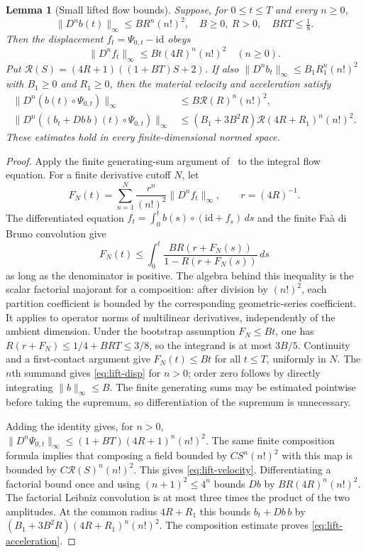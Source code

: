 \documentclass[11pt]{article}
\newtheorem{lemma}[theorem]{Lemma}
\theoremstyle{definition}
\begin{document}
\begin{lemma}[Small lifted flow bounds]\label{lem:small-lift}
Suppose, for $0\leq t\leq T$ and every $n\geq0$,
\[
 \|D^n b(t)\|_\infty\leq B R^n(n!)^2,
 \quad B\geq0,\ R>0,\quad BRT\leq\tfrac18.
\]
Then the displacement $f_t=\Psi_{0,t}-\mathrm{id}$ obeys
\begin{equation}\label{eq:lift-disp}
 \|D^n f_t\|_\infty\leq Bt(4R)^n(n!)^2 \quad(n\geq0).
\end{equation}
Put $\mathscr R(S)=(4R+1)((1+BT)S+2)$.
If also $\|D^n b_t\|_\infty\leq B_1R_1^n(n!)^2$ with
$B_1\ge0$ and $R_1\ge0$, then the
material velocity and acceleration satisfy
\begin{align}
 \|D^n(b(t)\circ\Psi_{0,t})\|_\infty
   &\leq B\mathscr R(R)^n(n!)^2,\label{eq:lift-velocity}\\
 \|D^n((b_t+Db\,b)(t)\circ\Psi_{0,t})\|_\infty
   &\leq(B_1+3B^2R)\mathscr R(4R+R_1)^n(n!)^2.
   \label{eq:lift-acceleration}
\end{align}
These estimates hold in every finite-dimensional normed space.
\end{lemma}
\begin{proof}
Apply the finite generating-sum argument of~\cite[\S3.8]{OAI} to
the integral flow equation. For a finite derivative cutoff $N$, let
\[
 F_N(t)=\sum_{n=1}^N\frac{r^n}{(n!)^2}
                 \|D^n f_t\|_\infty,\qquad r=(4R)^{-1}.
\]
The differentiated equation $f_t=\int_0^t b(s)\circ
(\mathrm{id}+f_s)\,ds$ and the finite Fa\`a di Bruno convolution give
\[
 F_N(t)\leq\int_0^t
  \frac{BR(r+F_N(s))}{1-R(r+F_N(s))}\,ds
\]
as long as the denominator is positive. The algebra behind this
inequality is the scalar factorial majorant for a composition: after
division by $(n!)^2$, each partition coefficient is bounded by the
corresponding geometric-series coefficient. It applies to operator
norms of multilinear derivatives, independently of the ambient
dimension. Under the bootstrap assumption $F_N\leq Bt$, one has
$R(r+F_N)\leq1/4+BRT\leq3/8$, so the integrand is at most $3B/5$.
Continuity and a first-contact argument give $F_N(t)\leq Bt$ for all
$t\leq T$, uniformly in $N$. The $n$th summand gives
\eqref{eq:lift-disp} for $n>0$; order zero follows by directly integrating
$\|b\|_\infty\leq B$. The finite generating sums may be estimated pointwise before taking
the supremum, so differentiation of the supremum is unnecessary.

Adding the identity gives, for $n>0$,
$\|D^n\Psi_{0,t}\|_\infty\leq
(1+BT)(4R+1)^n(n!)^2$. The same finite composition formula implies
that composing a field bounded by $C S^n(n!)^2$ with this map is bounded
by $C\mathscr R(S)^n(n!)^2$. This gives
\eqref{eq:lift-velocity}. Differentiating a factorial bound once and
using $(n+1)^2\leq4^n$ bounds $Db$ by $BR(4R)^n(n!)^2$.
The factorial Leibniz convolution is at most three times the product
of the two amplitudes. At the common radius $4R+R_1$ this bounds
$b_t+Db\,b$ by $(B_1+3B^2R)(4R+R_1)^n(n!)^2$.
The composition estimate proves \eqref{eq:lift-acceleration}.
\end{proof}
\end{document}
